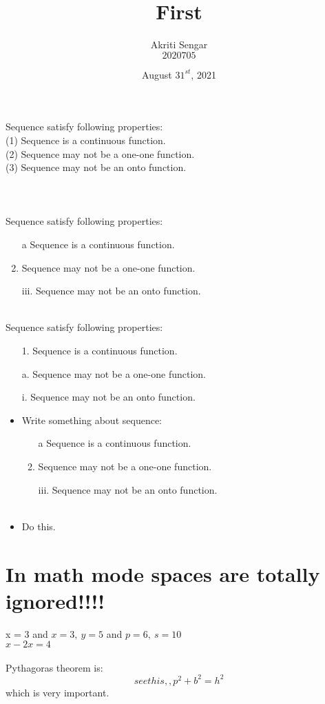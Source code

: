 \documentclass{article}
\title{\textbf{First}}
\author{Akriti Sengar \\ $2020705$}
\date{August $31^{st}$, 2021}
\begin{document}
	\maketitle
	
	\noindent Sequence satisfy following properties:\\[0.2cm]
	(1) Sequence is a continuous function. \\[0.09cm]
	(2) Sequence may not be a one-one function.\\[0.09cm]
	(3) Sequence may not be an onto function. \\[0.09cm]\\\\\\
	
	\noindent Sequence satisfy following properties:
	\begin{enumerate}
		\item[{a}]  Sequence is a continuous function. 
		\item  Sequence may not be a one-one function.
		\item[{iii.}]  Sequence may not be an onto function. \\\\
	\end{enumerate}
	
	\noindent Sequence satisfy following properties:
	\begin{itemize}
		\item[{1.}]  Sequence is a continuous function. 
		\item[{a.}]  Sequence may not be a one-one function.
		\item[{i.}]  Sequence may not be an onto function.
		\item Write something about sequence:\\
		\begin{enumerate}
			\item[{a}]  Sequence is a continuous function. 
			\item  Sequence may not be a one-one function.
			\item[{iii.}]  Sequence may not be an onto function. \\\\
		\end{enumerate}
		\item Do this.
	\end{itemize}
	
	\section*{In math mode spaces are totally ignored!!!!}
	x = 3 and $ x=3,\ y=5 $ and \(p=6,\ s=10\) \\ \(x-2x=4\) \\\\
	Pythagoras theorem is: \[ see this,, p^2+b^2=h^2\] which is very important.
	
\end{document}
